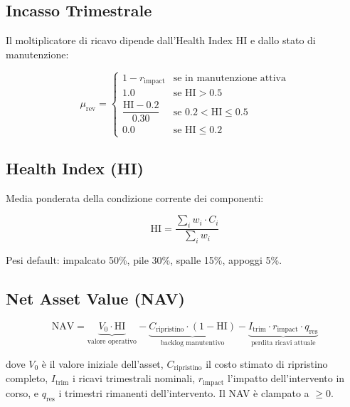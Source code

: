 \documentclass[11pt,a4paper]{article}
\begin{document}
\subsection{Incasso Trimestrale}

Il moltiplicatore di ricavo dipende dall'Health Index $\text{HI}$ e dallo stato di manutenzione:

\begin{equation}
  \mu_{\text{rev}} = \begin{cases}
    1 - r_{\text{impact}}           & \text{se in manutenzione attiva} \\
    1.0                              & \text{se } \text{HI} > 0.5 \\
    \dfrac{\text{HI} - 0.2}{0.30}   & \text{se } 0.2 < \text{HI} \leq 0.5 \\
    0.0                              & \text{se } \text{HI} \leq 0.2
  \end{cases}
\end{equation}

\subsection{Health Index (HI)}

Media ponderata della condizione corrente dei componenti:

\begin{equation}
  \text{HI} = \frac{\sum_i w_i \cdot C_i}{\sum_i w_i}
\end{equation}

Pesi default: impalcato 50\%, pile 30\%, spalle 15\%, appoggi 5\%.

\subsection{Net Asset Value (NAV)}

\begin{equation}
  \text{NAV} = \underbrace{V_0 \cdot \text{HI}}_{\text{valore operativo}}
              - \underbrace{C_{\text{ripristino}} \cdot (1 - \text{HI})}_{\text{backlog manutentivo}}
              - \underbrace{I_{\text{trim}} \cdot r_{\text{impact}} \cdot q_{\text{res}}}_{\text{perdita ricavi attuale}}
\end{equation}

dove $V_0$ \`e il valore iniziale dell'asset, $C_{\text{ripristino}}$ il costo stimato di ripristino completo, $I_{\text{trim}}$ i ricavi trimestrali nominali, $r_{\text{impact}}$ l'impatto dell'intervento in corso, e $q_{\text{res}}$ i trimestri rimanenti dell'intervento. Il NAV \`e clampato a $\geq 0$.
\end{document}
